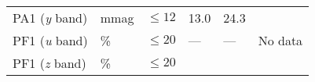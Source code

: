 \documentclass[DM,toc]{lsstdoc}
\begin{document}
\begin{longtable}[]{@{}llllll@{}}
\begin{minipage}[t]{0.14\columnwidth}\raggedright\strut
PA1 (\emph{y} band)\strut
\end{minipage} & \begin{minipage}[t]{0.06\columnwidth}\raggedright\strut
mmag\strut
\end{minipage} & \begin{minipage}[t]{0.17\columnwidth}\raggedright\strut
\(\leq 12\)\strut
\end{minipage} & \begin{minipage}[t]{0.17\columnwidth}\raggedright\strut
13.0\strut
\end{minipage} & \begin{minipage}[t]{0.12\columnwidth}\raggedright\strut
24.3\strut
\end{minipage} & \begin{minipage}[t]{0.17\columnwidth}\raggedright\strut
\strut
\end{minipage}\tabularnewline
\begin{minipage}[t]{0.14\columnwidth}\raggedright\strut
PF1 (\emph{u} band)\strut
\end{minipage} & \begin{minipage}[t]{0.06\columnwidth}\raggedright\strut
\%\strut
\end{minipage} & \begin{minipage}[t]{0.17\columnwidth}\raggedright\strut
\(\leq 20\)\strut
\end{minipage} & \begin{minipage}[t]{0.17\columnwidth}\raggedright\strut
---\strut
\end{minipage} & \begin{minipage}[t]{0.12\columnwidth}\raggedright\strut
---\strut
\end{minipage} & \begin{minipage}[t]{0.17\columnwidth}\raggedright\strut
No data\strut
\end{minipage}\tabularnewline
\begin{minipage}[t]{0.14\columnwidth}\raggedright\strut
PF1 (\emph{z} band)\strut
\end{minipage} & \begin{minipage}[t]{0.06\columnwidth}\raggedright\strut
\%\strut
\end{minipage} & \begin{minipage}[t]{0.17\columnwidth}\raggedright\strut
\(\leq 20\)\strut
\end{minipage} & \begin{minipage}[t]{0.17\columnwidth}\raggedright\strut

\end{minipage}
\end{longtable}
\end{document}

